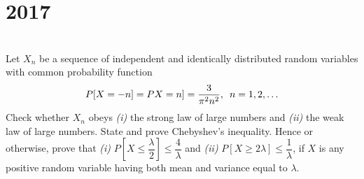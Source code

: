 \section*{2017}
\vspace{-.5cm}
\hrulefill \smallskip\\
 Let ${X_n}$ be a sequence of independent and identically distributed random variables with common probability function \[ P[X=-n] = P{X=n] = \dfrac{3}{\pi^2n^2}, \enskip n=1,2,\ldots}\] Check whether $X_n$ obeys \textit{(i)} the strong law  of large numbers and \textit{(ii)} the weak law of large numbers.
\myline
{} State and prove Chebyshev's inequality. Hence or otherwise, prove that \textit{(i)} $P\left[ X \leq \dfrac{\lambda}{2} \right] \leq \dfrac{4}{\lambda}$ and \textit{(ii)} $P[X \geq 2\lambda] \leq \dfrac{1}{\lambda}$, if $X$ is any positive random variable having both mean and variance equal to $\lambda$.